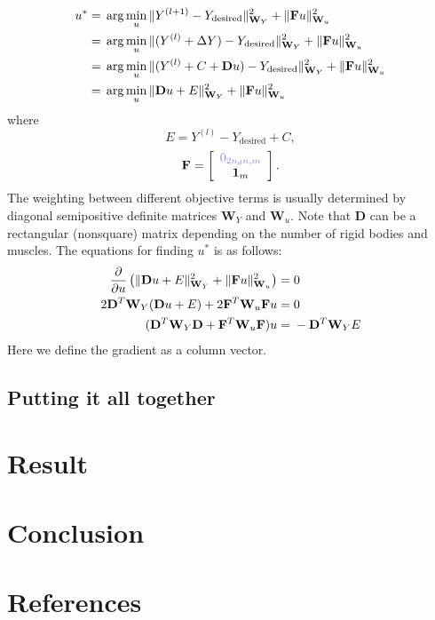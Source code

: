 \documentclass[a4paper,10pt]{article}
\begin{document}
\begin{align}
u^*= {} & \arg\min_{u} \| Y^{(l+1)}                            - Y_\text{desired} \|^2_{\mathbf{W}_Y} + \| \mathbf{F}u \|^2_{\mathbf{W}_u} \notag\\
   = {} & \arg\min_{u} \| (Y^{(l)} + \Delta Y)                 - Y_\text{desired} \|^2_{\mathbf{W}_Y} + \| \mathbf{F}u \|^2_{\mathbf{W}_u}\notag\\
   = {} & \arg\min_{u} \| (Y^{(l)} + C + \mathbf{D}u) - Y_\text{desired} \|^2_{\mathbf{W}_Y} + \| \mathbf{F}u \|^2_{\mathbf{W}_u}\notag\\
   = {} & \arg\min_{u} \| \mathbf{D}u + E \|^2_{\mathbf{W}_Y}  + \| \mathbf{F}u \|^2_{\mathbf{W}_u}
\end{align}
where
\begin{equation}
E = Y^{(l)} - Y_\text{desired} + C ,
\end{equation}
\begin{equation}
\mathbf{F} = \left[ \begin{array}{c}
\zm{2n_d n,m}\\
\mathbf{1}_m
\end{array}  \right].
\end{equation}
The weighting between different objective terms is
usually determined by diagonal semipositive definite matrices $\mathbf{W}_Y$ and $\mathbf{W}_u$.
Note that $\mathbf{D}$ can be a rectangular (nonsquare) matrix depending on the number of rigid bodies and
muscles. The equations for finding $u^*$ is as follows:
\begin{align}
\frac{\partial}{\partial u} \left( \| \mathbf{D}u + E \|^2_{\mathbf{W}_Y}  + \| \mathbf{F}u \|^2_{\mathbf{W}_u} \right) = {} & 0  \notag\\
2\mathbf{D}^T\mathbf{W}_Y(\mathbf{D}u+E) + 2\mathbf{F}^T\mathbf{W}_u \mathbf{F}u = {} & 0\notag\\
(\mathbf{D}^T\mathbf{W}_Y\mathbf{D}+\mathbf{F}^T\mathbf{W}_u\mathbf{F})u = {} & -\mathbf{D}^T\mathbf{W}_Y E
\end{align}
Here we define the gradient as a column vector.

\subsection{Putting it all together}

\section{Result}

\section{Conclusion}

\section{References}
\end{document}
